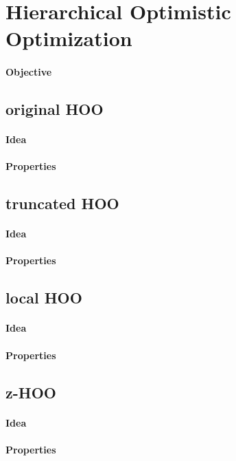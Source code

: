 \documentclass[a4paper,11pt,titlepage]{article}
\begin{document}
\section{Hierarchical Optimistic Optimization}
\paragraph{Objective}
\subsection{original HOO}
\paragraph{Idea}
\paragraph{Properties}
\subsection{truncated HOO}
\paragraph{Idea}
\paragraph{Properties}
\subsection{local HOO}
\paragraph{Idea}
\paragraph{Properties}
\subsection{z-HOO}
\paragraph{Idea}
\paragraph{Properties}
\end{document}
